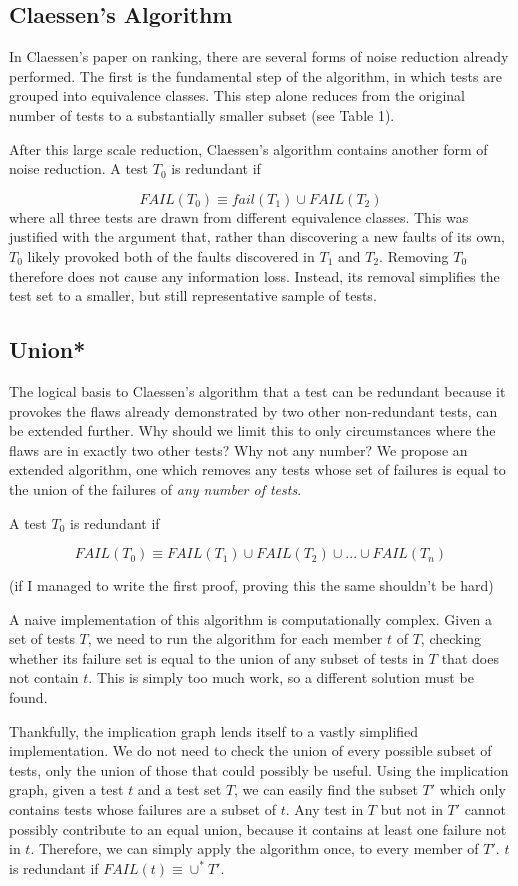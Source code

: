 \documentclass[11pt,twoside]{article}
\newcommand\fail{\mathit{FAIL}}
\theoremstyle{definition}
\let\cite=\citep
\begin{document}
\subsection{Claessen's Algorithm}
In Claessen's paper on ranking, there are several forms of noise reduction already performed. The first is the fundamental step of the algorithm, in which tests are grouped into equivalence classes. This step alone reduces from the original number of tests to a substantially smaller subset (see Table 1).

After this large scale reduction, Claessen's algorithm contains another form of noise reduction. A test $T_0$ is redundant if

$$\fail (T_0) \equiv fail(T_1) \cup \fail(T_2)$$
where all three tests are drawn from different equivalence classes. This was justified with the argument that, rather than discovering a new faults of its own, $T_0$ likely provoked both of the faults discovered in $T_1$ and $T_2$. Removing $T_0$ therefore does not cause any information loss. Instead, its removal simplifies the test set to a smaller, but still representative sample of tests.

\subsection{Union*}
The logical basis to Claessen's algorithm that a test can be redundant because it provokes the flaws already demonstrated by two other non-redundant tests\cite{Claessen}, can be extended further. Why should we limit this to only circumstances where the flaws are in exactly two other tests? Why not any number? We propose an extended algorithm, one which removes any tests whose set of failures is equal to the union of the failures of \emph{any number of tests}. 

A test $T_0$ is redundant if

$$\fail (T_0) \equiv \fail(T_1) \cup \fail(T_2) \cup ... \cup \fail(T_n) $$

(if I managed to write the first proof, proving this the same shouldn't be hard)

A naive implementation of this algorithm is computationally complex. Given a set of tests $T$, we need to run the algorithm for each member $t$ of $T$, checking whether its failure set is equal to the union of any subset of tests in $T$ that does not contain $t$. This is simply too much work, so a different solution must be found.

Thankfully, the implication graph lends itself to a vastly simplified implementation. We do not need to check the union of every possible subset of tests, only the union of those that could possibly be useful. Using the implication graph, given a test $t$ and a test set $T$, we can easily find the subset $T'$ which only contains tests whose failures are a subset of $t$. Any test in $T$ but not in $T'$ cannot possibly contribute to an equal union, because it contains at least one failure not in $t$. Therefore, we can simply apply the algorithm once, to every member of $T'$. $t$ is redundant if $\fail(t) \equiv \cup^* T'$.
\end{document}
